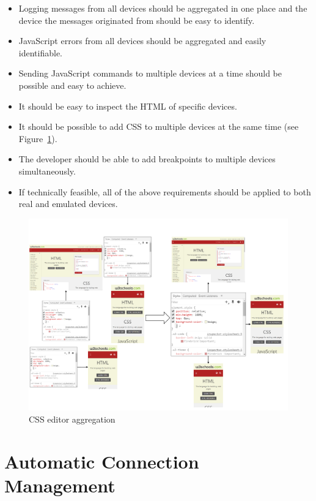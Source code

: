 \begin{itemize}
	\item Logging messages from all devices should be aggregated in one place and the device the messages originated from should be easy to identify.
	\item JavaScript errors from all devices should be aggregated and easily identifiable.
	\item Sending JavaScript commands to multiple devices at a time should be possible and easy to achieve. 
	\item It should be easy to inspect the HTML of specific devices.
	\item It should be possible to add CSS to multiple devices at the same time (see Figure~\ref{fig:css_aggregation}).
	\item The developer should be able to add breakpoints to multiple devices simultaneously.
	\item If technically feasible, all of the above requirements should be applied to both real and emulated devices.
\end{itemize}

\begin{figure}[H]
  \centering
    \includegraphics[width=1.0\textwidth]{images/css_aggregation_4.pdf}
	\caption[CSS editor aggregation]{CSS editor aggregation}
	\label{fig:css_aggregation}
\end{figure}

\section{Automatic Connection Management}

